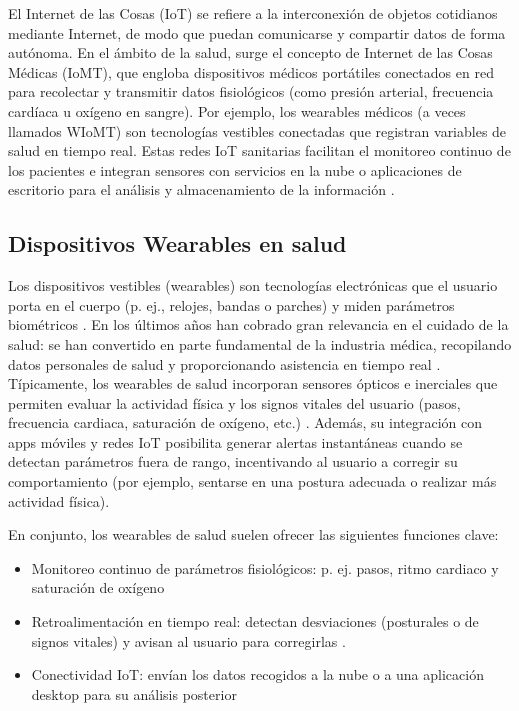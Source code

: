 \documentclass[manuscript,screen,review]{acmart}
\begin{document}
El Internet de las Cosas (IoT) se refiere a la interconexión de objetos cotidianos mediante Internet, de modo que puedan comunicarse y compartir datos de forma autónoma. En el ámbito de la salud, surge el concepto de Internet de las Cosas Médicas (IoMT), que engloba dispositivos médicos portátiles conectados en red para recolectar y transmitir datos fisiológicos (como presión arterial, frecuencia cardíaca u oxígeno en sangre). Por ejemplo, los wearables médicos (a veces llamados WIoMT) son tecnologías vestibles conectadas que registran variables de salud en tiempo real. Estas redes IoT sanitarias facilitan el monitoreo continuo de los pacientes e integran sensores con servicios en la nube o aplicaciones de escritorio para el análisis y almacenamiento de la información \cite{Thapa2023}.

\subsection{Dispositivos Wearables en salud}
Los dispositivos vestibles (wearables) son tecnologías electrónicas que el usuario porta en el cuerpo (p. ej., relojes, bandas o parches) y miden parámetros biométricos \cite{Simpson2019}. En los últimos años han cobrado gran relevancia en el cuidado de la salud: se han convertido en parte fundamental de la industria médica, recopilando datos personales de salud y proporcionando asistencia en tiempo real \cite{Simpson2019}. Típicamente, los wearables de salud incorporan sensores ópticos e inerciales que permiten evaluar la actividad física y los signos vitales del usuario (pasos, frecuencia cardiaca, saturación de oxígeno, etc.)
\cite{Simpson2019} \cite{Torp2023}. Además, su integración con apps móviles y redes IoT posibilita generar alertas instantáneas cuando se detectan parámetros fuera de rango, incentivando al usuario a corregir su comportamiento (por ejemplo, sentarse en una postura adecuada o realizar más actividad física).

En conjunto, los wearables de salud suelen ofrecer las siguientes funciones clave:
\begin{itemize}
\item Monitoreo continuo de parámetros fisiológicos: p. ej. pasos, ritmo cardiaco y saturación de oxígeno
\item Retroalimentación en tiempo real: detectan desviaciones (posturales o de signos vitales) y avisan al usuario para corregirlas \cite{Figueira2024}.
\item Conectividad IoT: envían los datos recogidos a la nube o a una aplicación desktop para su análisis posterior
\end{itemize}
\end{document}

